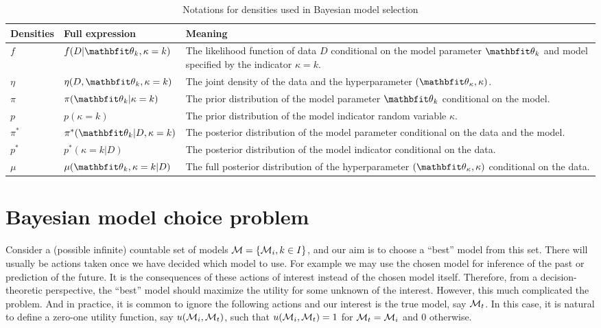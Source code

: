 \begin{table}[ht]
  \caption{Notations for densities used in Bayesian model selection}
  \label{tab:notations}
  \begin{tabularx}{\textwidth}{llX}
    \toprule
    Densities & Full expression & Meaning \\
    \midrule
    $f$ & $f(D|\bth_k,\kappa=k)$
      & The likelihood function of data $D$ conditional on the model parameter $\bth_k$ and model specified by the
      indicator $\kappa = k$. \\
    $\eta$ & $\eta(D,\bth_k,\kappa=k)$
      & The joint density of the data and the hyperparameter $(\bth_{\kappa},\kappa)$. \\
    $\pi$ & $\pi(\bth_k|\kappa=k)$
      & The prior distribution of the model parameter $\bth_k$ conditional on the model. \\
    $p$ & $p(\kappa = k)$
      & The prior distribution of the model indicator random variable $\kappa$. \\
    $\pi^*$ & $\pi^*(\bth_k|D,\kappa=k)$
      & The posterior distribution of the model parameter conditional on the data and the model. \\
    $p^*$ & $p^*(\kappa=k|D)$
      & The posterior distribution of the model indicator conditional on the data. \\
    $\mu$ & $\mu(\bth_k,\kappa=k|D)$
      & The full posterior distribution of the hyperparameter $(\bth_{\kappa},\kappa)$ conditional on the data. \\
    \bottomrule
  \end{tabularx}
\end{table}

\section{Bayesian model choice problem}
\label{sec:Bayesian model choice problem}

Consider a (possible infinite) countable set of models $\mathcal{M} = \{\mathcal{M}_i,
  k\in I\}$, and our aim is to choose a ``best'' model from this set. There
will usually be actions taken once we have decided which model to use. For
example we may use the chosen model for inference of the past or prediction of
the future. It is the consequences of these actions of interest instead of the
chosen model itself. Therefore, from a decision-theoretic perspective, the
``best'' model should maximize the utility for some unknown of the interest.
However, this much complicated the problem. And in practice, it is common to
ignore the following actions and our interest is the true model, say
$\mathcal{M}_t$. In this case, it is natural to define a zero-one utility function,
say $u(\mathcal{M}_i,\mathcal{M}_t)$, such that $u(\mathcal{M}_i,\mathcal{M}_t) = 1$ for $\mathcal{M}_t =
\mathcal{M}_i$ and $0$ otherwise.

